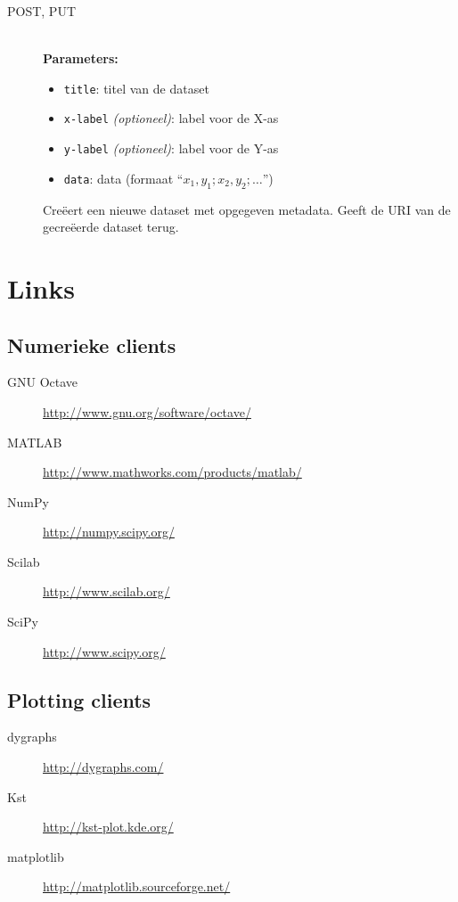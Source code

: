\documentclass[a4paper]{article}
\begin{document}
\begin{itemize}
\begin{description}
      \item[POST, PUT] \hfill \\
        {\bf Parameters:}
        \begin{itemize}
          \item {\tt title}: titel van de dataset
          \item {\tt x-label} {\it (optioneel)}: label voor de X-as
          \item {\tt y-label} {\it (optioneel)}: label voor de Y-as
          \item {\tt data}: data (formaat ``$x_1,y_1;x_2,y_2;\ldots$'')
        \end{itemize}
        Cre\"eert een nieuwe dataset met opgegeven metadata. Geeft de \gls{URI}
        van de gecre\"eerde dataset terug.
    \end{description}
\end{itemize}


\section{Links}

\subsection*{Numerieke clients}

\begin{description}
    \item[\gls{GNU} Octave] \url{http://www.gnu.org/software/octave/}
    \item[MATLAB]           \url{http://www.mathworks.com/products/matlab/}
    \item[NumPy]            \url{http://numpy.scipy.org/}
    \item[Scilab]           \url{http://www.scilab.org/}
    \item[SciPy]            \url{http://www.scipy.org/}
\end{description}

\subsection*{Plotting clients}

\begin{description}
    \item[dygraphs]     \url{http://dygraphs.com/}
    \item[Kst]          \url{http://kst-plot.kde.org/}
    \item[matplotlib]   \url{http://matplotlib.sourceforge.net/}
\end{description}
\end{document}
